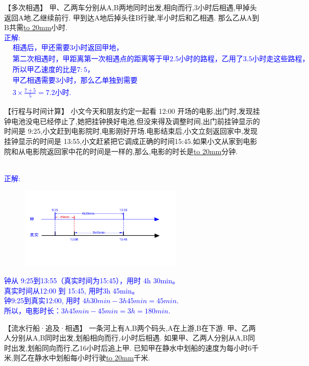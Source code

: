 \item {
    【多次相遇】
    甲、乙两车分别从A,B两地同时出发,相向而行,3小时后相遇,甲掉头返回A地,乙继续前行. 甲到达A地后掉头往B行驶,半小时后和乙相遇. 那么乙从A到B共需\underline{\hbox to 20mm{}}小时.
    \ifshowSolution 
        \fangsong{}\textcolor{blue}{
            \\正解: 
            \begin{align*}
                &相遇后，甲还需要3小时返回甲地，\\
                &第二次相遇时，甲距离第一次相遇点的距离等于甲 2.5 小时的路程，乙用了3.5小时走这些路程，\\
                &所以甲乙速度的比是7:5，\\
                &甲乙相遇需要3小时，那么乙单独到需要\\
                &3\times \frac{7+5}{5} = 7.2小时.
            \end{align*}
        }
    \else
        \vspace{1cm}
    \fi
}

\item {
    【行程与时间计算】
    小文今天和朋友约定一起看 12:00 开场的电影,出门时,发现挂钟电池没电已经停止了,她把挂钟换好电池,但没来得及调整时间,出门前挂钟显示的时间是 9:25,小文赶到电影院时,电影刚好开场.电影结束后,小文立刻返回家中,发现挂钟显示的时间是 13:55,小文赶紧把它调成正确的时间15:45.如果小文从家到电影院和从电影院返回家中花的时间是一样的,那么,电影的时长是\underline{\hbox to 20mm{}}分钟.
    \ifshowSolution 
        \fangsong{}\textcolor{blue}{
            \\正解:
            \begin{figure}[H] 
                \centering
                \includegraphics[width=0.7\textwidth]{./pics/Chapter_3/seikai_8.png}
            \end{figure}
            钟从 9:25到13:55（真实时间为15:45），用时 4h 30min。\\
            真实时间从12:00 到 15:45, 用时3h 45min。\\
            钟9:25到真实12:00, 用时 $4h 30min - 3h 45min = 45min$.\\
            所以，电影时长：$3h 45min - 45min = 3h = 180min$.
        }
    \else
        \vspace{1cm}
    \fi
}

\item {
    【流水行船·追及·相遇】
    一条河上有A,B两个码头,A在上游,B在下游. 甲、乙两人分别从A,B同时出发,划船相向而行,4小时后相遇. 如果甲、乙两人分别从A,B同时出发,划船同向而行,乙16小时后追上甲. 已知甲在静水中划船的速度为每小时6千米,则乙在静水中划船每小时行驶\underline{\hbox to 20mm{}}千米.
    \vspace{2cm}
}
